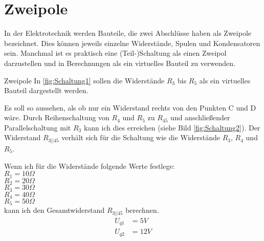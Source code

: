 \documentclass[aspectratio=169, ignorenonframetext]{beamer}
\begin{document}
\section{Zweipole}
In der Elektrotechnik werden Bauteile, die zwei Abschlüsse haben als Zweipole bezeichnet. Dies können jeweils einzelne Widerstände, Spulen und Kondensatoren sein. Manchmal ist es praktisch eine (Teil-)Schaltung als einen Zweipol darzustellen und in Berechnungen als ein virtuelles Bauteil zu verwenden.
\begin{Frame}{Zweipole}
In \ref{fig:Schaltung1} sollen die Widerstände $R_3$ bis $R_5$ als ein virtuelles Bauteil dargestellt werden.
\end{Frame}
Es soll so aussehen, als ob nur ein Widerstand rechts von den Punkten C und D wäre. Durch Reihenschaltung von $R_4$ und $R_5$ zu $R_{45}$ und anschließender Parallelschaltung mit $R_3$ kann ich dies erreichen (siehe Bild \ref{fig:Schaltung2}). Der Widerstand $R_{3||45}$ verhält sich für die Schaltung wie die Widerstände $R_3$, $R_4$ und $R_5$.
%
\begin{frame}
Wenn ich für die Widerstände folgende Werte festlege:\\
$R_1 = 10 \Omega$\\ $R_2 = 20 \Omega$\\ $ R_3 = 30 \Omega$\\ $ R_4 = 40 \Omega$\\ $ R_5 = 50 \Omega$\\
\label{comp:WiderstaendeSchaltung1}
kann ich den Gesamtwiderstand $R_{3||45}$ berechnen.
\begin{align}
U_{q1} &= 5V\\
 U_{q2} &= 12V
\end{align}
\end{frame}
\end{document}
